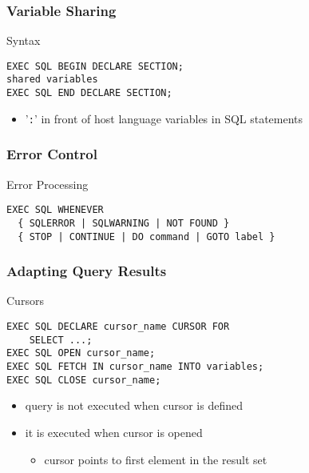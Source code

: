 \documentclass[dvipsnames]{beamer}
\theoremstyle{plain}
\begin{document}
\begin{frame}[fragile]
  \frametitle{Variable Sharing}

  \begin{block}{Syntax}
    \begin{lstlisting}
EXEC SQL BEGIN DECLARE SECTION;
shared variables
EXEC SQL END DECLARE SECTION;
    \end{lstlisting}
  \end{block}

  \begin{itemize}
    \item '\lstinline!:!' in front of host language variables in SQL statements
  \end{itemize}
\end{frame}

\begin{frame}[fragile]
  \frametitle{Error Control}

  \begin{block}{Error Processing}
    \begin{lstlisting}
EXEC SQL WHENEVER
  { SQLERROR | SQLWARNING | NOT FOUND }
  { STOP | CONTINUE | DO command | GOTO label }
    \end{lstlisting}
  \end{block}
\end{frame}

\begin{frame}[fragile]
  \frametitle{Adapting Query Results}

  \begin{block}{Cursors}
    \begin{lstlisting}
EXEC SQL DECLARE cursor_name CURSOR FOR
    SELECT ...;
EXEC SQL OPEN cursor_name;
EXEC SQL FETCH IN cursor_name INTO variables;
EXEC SQL CLOSE cursor_name;
    \end{lstlisting}
  \end{block}

  \pause
  \begin{itemize}
    \item query is not executed when cursor is defined
    \item it is executed when cursor is opened
    \begin{itemize}
      \item cursor points to first element in the result set
    \end{itemize}
  \end{itemize}
\end{frame}
\end{document}
